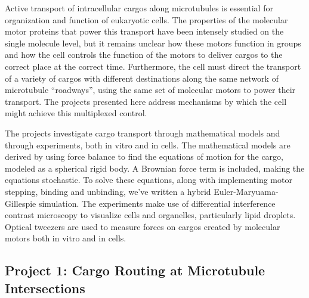 \executivesummary
{
 Active transport of intracellular cargos along microtubules is essential for organization and function of eukaryotic cells. The properties of the molecular motor proteins that power this transport have been intensely studied on the single molecule level, but it remains unclear how these motors function in groups and how the cell controls the function of the motors to deliver cargos to the correct place at the correct time. Furthermore, the cell must direct the transport of a variety of cargos with different destinations along the same network of microtubule ``roadways'', using the same set of molecular motors to power their transport. The projects presented here address mechanisms by which the cell might achieve this multiplexed control.

The projects investigate cargo transport through mathematical models and through experiments, both in vitro and in cells. The mathematical models are derived by using force balance to find the equations of motion for the cargo, modeled as a spherical rigid body. A Brownian force term is included, making the equations stochastic. To solve these equations, along with implementing motor stepping, binding and unbinding, we've written a hybrid Euler-Maryuama-Gillespie simulation. The experiments make use of differential interference contrast microscopy to visualize cells and organelles, particularly lipid droplets. Optical tweezers are used to measure forces on cargos created by molecular motors both in vitro and in cells.

\subsection*{Project 1: Cargo Routing at Microtubule Intersections}

}
